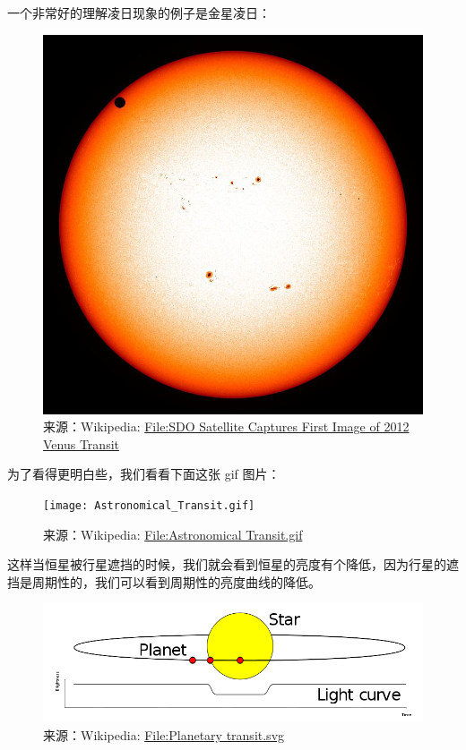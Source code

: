 \documentclass[letterpaper,10pt,english]{sphinxmanual}
\begin{document}
一个非常好的理解凌日现象的例子是金星凌日：
\begin{figure}[htbp]
\centering
\capstart

\includegraphics{SDO_Satellite_Captures_First_Image_of_2012_Venus_Transit.jpg}
\caption{来源：Wikipedia: \href{https://en.wikipedia.org/wiki/File:NASA\%27s\_SDO\_Satellite\_Captures\_First\_Image\_of\_2012\_Venus\_Transit\_(Full\_Disc).jpg}{File:SDO Satellite Captures First Image of 2012 Venus Transit}}\end{figure}

为了看得更明白些，我们看看下面这张 gif 图片：
\begin{figure}[htbp]
\centering
\capstart

\texttt{[image: Astronomical\_Transit.gif]}
\caption{来源：Wikipedia: \href{https://en.wikipedia.org/wiki/File:Astronomical\_Transit.gif}{File:Astronomical Transit.gif}}\end{figure}

这样当恒星被行星遮挡的时候，我们就会看到恒星的亮度有个降低，因为行星的遮挡是周期性的，我们可以看到周期性的亮度曲线的降低。
\begin{figure}[htbp]
\centering
\capstart

\includegraphics{Planetary_transit.svg.png}
\caption{来源：Wikipedia: \href{https://commons.wikimedia.org/wiki/File:Planetary\_transit.svg}{File:Planetary transit.svg}}\end{figure}
\end{document}
